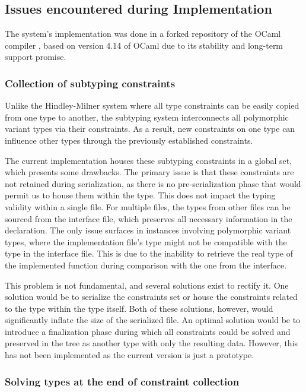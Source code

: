 \documentclass[a4paper,11pt,oneside]{article}
\theoremstyle{definition}
\begin{document}
\subsection{Issues encountered during Implementation}

The system's implementation was done in a forked repository of the OCaml compiler \cite{REPO}, based on version 4.14 of OCaml due to its stability and long-term support promise.

\subsubsection{Collection of subtyping constraints}

Unlike the Hindley-Milner system where all type constraints can be easily copied from one type to another, the subtyping system interconnects all polymorphic variant types via their constraints. As a result, new constraints on one type can influence other types through the previously established constraints.

The current implementation houses these subtyping constraints in a global set, which presents some drawbacks. The primary issue is that these constraints are not retained during serialization, as there is no pre-serialization phase that would permit us to house them within the type. This does not impact the typing validity within a single file. For multiple files, the types from other files can be sourced from the interface file, which preserves all necessary information in the declaration. The only issue surfaces in instances involving polymorphic variant types, where the implementation file's type might not be compatible with the type in the interface file. This is due to the inability to retrieve the real type of the implemented function during comparison with the one from the interface.

This problem is not fundamental, and several solutions exist to rectify it. One solution would be to serialize the constraints set or house the constraints related to the type within the type itself. Both of these solutions, however, would significantly inflate the size of the serialized file. An optimal solution would be to introduce a finalization phase during which all constraints could be solved and preserved in the tree as another type with only the resulting data. However, this has not been implemented as the current version is just a prototype.

\subsubsection{Solving types at the end of constraint collection}
\end{document}
